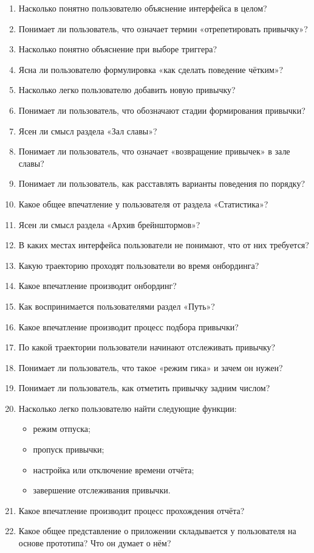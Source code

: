 \documentclass[pdflatex,sn-mathphys-num]{sn-jnl}%
\theoremstyle{thmstyleone}%
\theoremstyle{thmstyletwo}%
\theoremstyle{thmstylethree}%
\begin{document}
\begin{enumerate}
  \item Насколько понятно пользователю объяснение интерфейса в целом?
  \item Понимает ли пользователь, что означает термин «отрепетировать привычку»?
  \item Насколько понятно объяснение при выборе триггера?
  \item Ясна ли пользователю формулировка «как сделать поведение чётким»?
  \item Насколько легко пользователю добавить новую привычку?
  \item Понимает ли пользователь, что обозначают стадии формирования привычки?
  \item Ясен ли смысл раздела «Зал славы»?
  \item Понимает ли пользователь, что означает «возвращение привычек» в зале славы?
  \item Понимает ли пользователь, как расставлять варианты поведения по порядку?
  \item Какое общее впечатление у пользователя от раздела «Статистика»?
  \item Ясен ли смысл раздела «Архив брейнштормов»?
  \item В каких местах интерфейса пользователи не понимают, что от них требуется?
  \item Какую траекторию проходят пользователи во время онбординга?
  \item Какое впечатление производит онбординг?
  \item Как воспринимается пользователями раздел «Путь»?
  \item Какое впечатление производит процесс подбора привычки?
  \item По какой траектории пользователи начинают отслеживать привычку?
  \item Понимает ли пользователь, что такое «режим гика» и зачем он нужен?
  \item Понимает ли пользователь, как отметить привычку задним числом?
  \item Насколько легко пользователю найти следующие функции:
    \begin{itemize}
      \item режим отпуска;
      \item пропуск привычки;
      \item настройка или отключение времени отчёта;
      \item завершение отслеживания привычки.
    \end{itemize}
  \item Какое впечатление производит процесс прохождения отчёта?
  \item Какое общее представление о приложении складывается у пользователя на основе прототипа? Что он думает о нём?
\end{enumerate}
\end{document}
